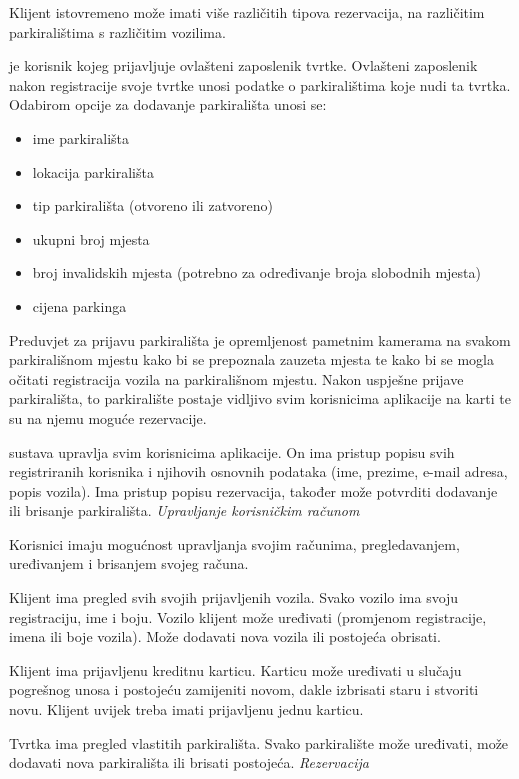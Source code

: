 Klijent istovremeno može imati više različitih tipova rezervacija, na različitim parkiralištima s različitim vozilima.

\textit{} je korisnik kojeg prijavljuje ovlašteni zaposlenik tvrtke. Ovlašteni zaposlenik nakon registracije svoje tvrtke unosi podatke o parkiralištima koje nudi ta tvrtka. Odabirom opcije za dodavanje parkirališta unosi se:
\begin{itemize}
    \item ime parkirališta
    \item lokacija parkirališta
    \item tip parkirališta (otvoreno ili zatvoreno)
    \item ukupni broj mjesta 
    \item broj invalidskih mjesta (potrebno za određivanje broja slobodnih mjesta)
    \item cijena parkinga
\end{itemize}
 Preduvjet za prijavu parkirališta je opremljenost pametnim kamerama na svakom parkirališnom mjestu kako bi se prepoznala zauzeta mjesta te kako bi se mogla očitati registracija vozila na parkirališnom mjestu. Nakon uspješne prijave parkirališta, to parkiralište postaje vidljivo svim korisnicima aplikacije na karti te su na njemu moguće rezervacije.
\newline

\textit{} sustava upravlja svim korisnicima aplikacije. On ima pristup popisu svih registriranih korisnika i njihovih osnovnih podataka (ime, prezime, e-mail adresa, popis vozila). Ima pristup popisu rezervacija,
također može potvrditi dodavanje ili brisanje parkirališta.
\newpage\textit{Upravljanje korisničkim računom}

Korisnici imaju mogućnost upravljanja svojim računima, pregledavanjem, uređivanjem i brisanjem svojeg računa.

Klijent ima pregled svih svojih prijavljenih vozila. Svako vozilo ima svoju registraciju, ime i boju. Vozilo klijent može uređivati (promjenom registracije, imena ili boje vozila). Može dodavati nova vozila ili postojeća obrisati. 

Klijent ima prijavljenu kreditnu karticu. Karticu može uređivati u slučaju pogrešnog unosa i postojeću zamijeniti novom, dakle izbrisati staru i stvoriti novu. Klijent uvijek treba imati prijavljenu jednu karticu.

Tvrtka ima pregled vlastitih parkirališta. Svako parkiralište može uređivati, može dodavati nova parkirališta ili brisati postojeća. 
\newline
\newline
\textit{Rezervacija}


